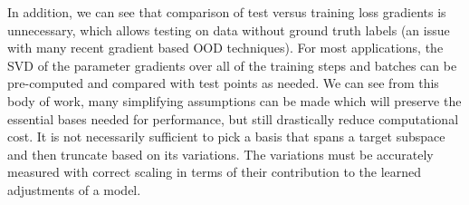 \begin{figure}[t]
\label{fig:trans}
\end{figure}

In addition, we can see that comparison of test versus training loss gradients is unnecessary, which allows testing on data without ground truth labels (an issue with many recent gradient based OOD techniques). 
For most applications, the SVD of the parameter gradients over all of
the training steps and batches can be pre-computed and compared with
test points as needed. We can see from this body of work, many simplifying assumptions can be made which will preserve the essential bases needed for performance, but still drastically reduce computational cost. It is not necessarily sufficient to pick a basis that spans a target subspace and then truncate based on its variations. The variations must be accurately measured with correct scaling in terms of their contribution to the learned adjustments of a model. %




